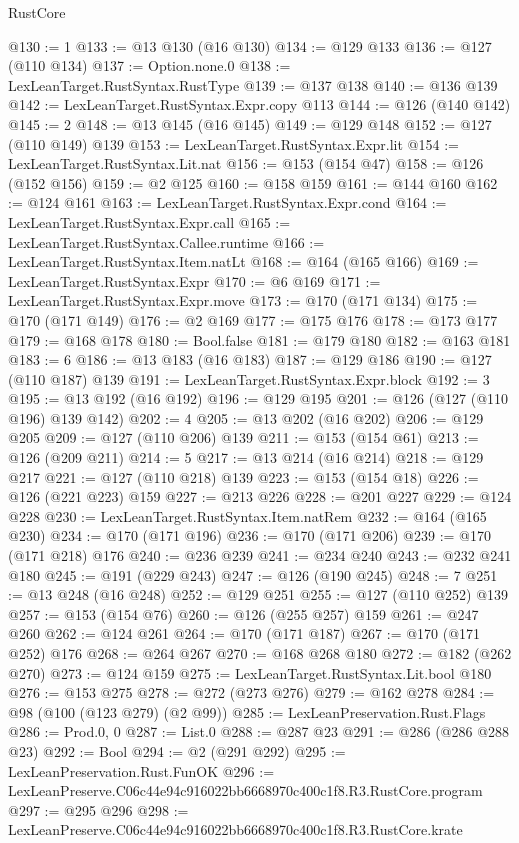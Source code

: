 \begin{lexlean}{RustCore}
\begin{coremodule}
@130 := 1
@133 := @13 @130 (@16 @130)
@134 := @129 @133
@136 := @127 (@110 @134)
@137 := Option.none.{0}
@138 := LexLeanTarget.RustSyntax.RustType
@139 := @137 @138
@140 := @136 @139
@142 := LexLeanTarget.RustSyntax.Expr.copy @113
@144 := @126 (@140 @142)
@145 := 2
@148 := @13 @145 (@16 @145)
@149 := @129 @148
@152 := @127 (@110 @149) @139
@153 := LexLeanTarget.RustSyntax.Expr.lit
@154 := LexLeanTarget.RustSyntax.Lit.nat
@156 := @153 (@154 @47)
@158 := @126 (@152 @156)
@159 := @2 @125
@160 := @158 @159
@161 := @144 @160
@162 := @124 @161
@163 := LexLeanTarget.RustSyntax.Expr.cond
@164 := LexLeanTarget.RustSyntax.Expr.call
@165 := LexLeanTarget.RustSyntax.Callee.runtime
@166 := LexLeanTarget.RustSyntax.Item.natLt
@168 := @164 (@165 @166)
@169 := LexLeanTarget.RustSyntax.Expr
@170 := @6 @169
@171 := LexLeanTarget.RustSyntax.Expr.move
@173 := @170 (@171 @134)
@175 := @170 (@171 @149)
@176 := @2 @169
@177 := @175 @176
@178 := @173 @177
@179 := @168 @178
@180 := Bool.false
@181 := @179 @180
@182 := @163 @181
@183 := 6
@186 := @13 @183 (@16 @183)
@187 := @129 @186
@190 := @127 (@110 @187) @139
@191 := LexLeanTarget.RustSyntax.Expr.block
@192 := 3
@195 := @13 @192 (@16 @192)
@196 := @129 @195
@201 := @126 (@127 (@110 @196) @139 @142)
@202 := 4
@205 := @13 @202 (@16 @202)
@206 := @129 @205
@209 := @127 (@110 @206) @139
@211 := @153 (@154 @61)
@213 := @126 (@209 @211)
@214 := 5
@217 := @13 @214 (@16 @214)
@218 := @129 @217
@221 := @127 (@110 @218) @139
@223 := @153 (@154 @18)
@226 := @126 (@221 @223) @159
@227 := @213 @226
@228 := @201 @227
@229 := @124 @228
@230 := LexLeanTarget.RustSyntax.Item.natRem
@232 := @164 (@165 @230)
@234 := @170 (@171 @196)
@236 := @170 (@171 @206)
@239 := @170 (@171 @218) @176
@240 := @236 @239
@241 := @234 @240
@243 := @232 @241 @180
@245 := @191 (@229 @243)
@247 := @126 (@190 @245)
@248 := 7
@251 := @13 @248 (@16 @248)
@252 := @129 @251
@255 := @127 (@110 @252) @139
@257 := @153 (@154 @76)
@260 := @126 (@255 @257) @159
@261 := @247 @260
@262 := @124 @261
@264 := @170 (@171 @187)
@267 := @170 (@171 @252) @176
@268 := @264 @267
@270 := @168 @268 @180
@272 := @182 (@262 @270)
@273 := @124 @159
@275 := LexLeanTarget.RustSyntax.Lit.bool @180
@276 := @153 @275
@278 := @272 (@273 @276)
@279 := @162 @278
@284 := @98 (@100 (@123 @279) (@2 @99))
@285 := LexLeanPreservation.Rust.Flags
@286 := Prod.{0, 0}
@287 := List.{0}
@288 := @287 @23
@291 := @286 (@286 @288 @23)
@292 := Bool
@294 := @2 (@291 @292)
@295 := LexLeanPreservation.Rust.FunOK
@296 := LexLeanPreserve.C06c44e94c916022bb6668970c400c1f8.R3.RustCore.program
@297 := @295 @296
@298 := LexLeanPreserve.C06c44e94c916022bb6668970c400c1f8.R3.RustCore.krate

\end{coremodule}
\end{lexlean}
